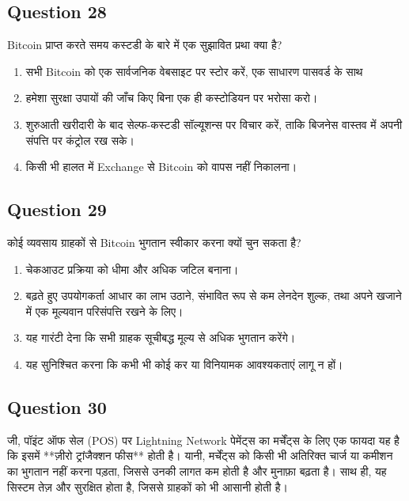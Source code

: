 \documentclass[12pt,a4paper]{article}
\begin{document}
\bigskip


\subsection*{Question 28}
Bitcoin प्राप्त करते समय कस्टडी के बारे में एक सुझावित प्रथा क्या है?

\begin{enumerate}[label=\Alph*., leftmargin=*]
\item सभी Bitcoin को एक सार्वजनिक वेबसाइट पर स्टोर करें, एक साधारण पासवर्ड के साथ
\item हमेशा सुरक्षा उपायों की जाँच किए बिना एक ही कस्टोडियन पर भरोसा करो।
\item शुरुआती खरीदारी के बाद सेल्फ-कस्टडी सॉल्यूशन्स पर विचार करें, ताकि बिजनेस वास्तव में अपनी संपत्ति पर कंट्रोल रख सके।
\item किसी भी हालत में Exchange से Bitcoin को वापस नहीं निकालना।
\end{enumerate}

\bigskip


\subsection*{Question 29}
कोई व्यवसाय ग्राहकों से Bitcoin भुगतान स्वीकार करना क्यों चुन सकता है?

\begin{enumerate}[label=\Alph*., leftmargin=*]
\item चेकआउट प्रक्रिया को धीमा और अधिक जटिल बनाना।
\item बढ़ते हुए उपयोगकर्ता आधार का लाभ उठाने, संभावित रूप से कम लेनदेन शुल्क, तथा अपने खजाने में एक मूल्यवान परिसंपत्ति रखने के लिए।
\item यह गारंटी देना कि सभी ग्राहक सूचीबद्ध मूल्य से अधिक भुगतान करेंगे।
\item यह सुनिश्चित करना कि कभी भी कोई कर या विनियामक आवश्यकताएं लागू न हों।
\end{enumerate}

\bigskip


\subsection*{Question 30}
जी, पॉइंट ऑफ सेल (POS) पर Lightning Network पेमेंट्स का मर्चेंट्स के लिए एक फायदा यह है कि इसमें **ज़ीरो ट्रांजैक्शन फीस** होती है। यानी, मर्चेंट्स को किसी भी अतिरिक्त चार्ज या कमीशन का भुगतान नहीं करना पड़ता, जिससे उनकी लागत कम होती है और मुनाफ़ा बढ़ता है। साथ ही, यह सिस्टम तेज़ और सुरक्षित होता है, जिससे ग्राहकों को भी आसानी होती है।
\end{document}
